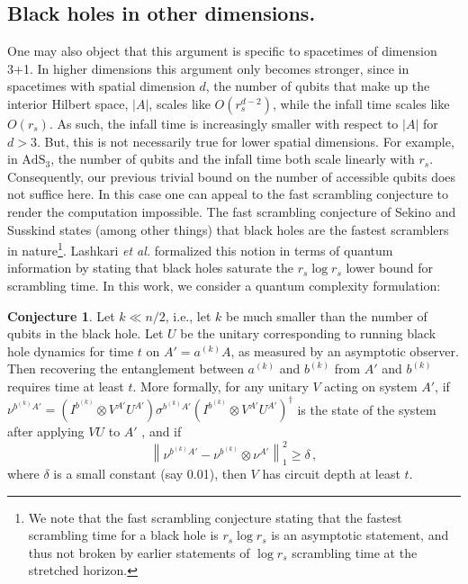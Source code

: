 \documentclass[a4paper,11pt]{article}
\theoremstyle{definition}
\newtheorem{conjecture}[theorem]{Conjecture}
\begin{document}
\subsection{Black holes in other dimensions.} 
\label{subsec:complexity} One may also object that this argument is specific to spacetimes of dimension 3+1.
In higher dimensions this argument only becomes stronger, since in spacetimes with spatial dimension $d$, the number of qubits that make up the interior Hilbert space, $|A|$, scales like $O(r_s^{d-2})$, while the infall time scales like $O({r_s})$.
As such, the infall time is increasingly smaller with respect to $|A|$ for $d > 3$.
But, this is not necessarily true for lower spatial dimensions.
For example, in $\mathrm{AdS}_3$, the number of qubits and the infall time both scale linearly with ${r_s}$.
Consequently, our previous trivial bound on the number of accessible qubits does not suffice here.
In this case one can appeal to the fast scrambling conjecture to render the computation impossible.
The fast scrambling conjecture of Sekino and Susskind \cite{Sekino:2008he} states (among other things) that black holes are the fastest scramblers in nature\footnote{We note that the fast scrambling conjecture stating that the fastest scrambling time for a black hole is ${r_s} \log {r_s}$ is an asymptotic statement, and thus not broken by earlier statements of $\log {r_s}$ scrambling time at the stretched horizon.}.
Lashkari \emph{et al.} \cite{Lashkari:2011yi} formalized this notion in terms of quantum information by stating that black holes saturate the ${r_s}\log {r_s}$ lower bound for scrambling time.
In this work, we consider a quantum complexity formulation:
\begin{conjecture} Let $k \ll n/2$, i.e., let $k$ be much smaller than the number of qubits in the black hole. Let $U$ be the unitary corresponding to running black hole dynamics for time $t$ on $A'=a^{(k)}A$, as measured by an asymptotic observer.
Then recovering the entanglement between $a^{(k)}$ and $b^{(k)}$ from $A'$ and $b^{(k)}$ requires time at least $t$.
More formally, for any unitary $V$ acting on system $A'$, if $\nu^{b^{(k)} A'} = (I^{b^{(k)}} \otimes V^{A'}U^{A'}) \sigma^{b^{(k)} A'} (I^{b^{(k)}} \otimes V^{A'} U^{A'})^\dagger$ is the state of the system after applying $VU$ to $A'$ , and if 
\[\left \| \nu^{b^{(k)} A'} - \nu^{b^{(k)}} \otimes \nu^{A'} \right \|_1^2 \geq \delta \, , \]
where $\delta$ is a small constant (say 0.01), then $V$ has circuit depth at least $t$.
\end{conjecture}
\end{document}
